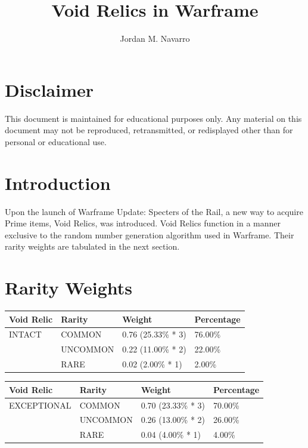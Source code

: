 \documentclass[12pt]{article}
\title{Void Relics in Warframe}
\author{Jordan M. Navarro}
\date{}
\begin{document}
\maketitle

\section{Disclaimer}

This document is maintained for educational purposes only. Any material on this document may not be reproduced, retransmitted, or redisplayed other than for personal or educational use.

\section{Introduction}

Upon the launch of Warframe Update: Specters of the Rail, a new way to acquire Prime items, Void Relics, was introduced. Void Relics function in a manner exclusive to the random number generation algorithm used in Warframe. Their rarity weights are tabulated in the next section.

\section{Rarity Weights}

\begin{center}
	\begin{tabular}{|l||l|l|l|}
		\hline
		Void Relic & Rarity   & Weight             & Percentage \\
		\hline
		INTACT     & COMMON   & 0.76 (25.33\% * 3) & 76.00\%    \\
		           & UNCOMMON & 0.22 (11.00\% * 2) & 22.00\%    \\
		           & RARE     & 0.02 (2.00\% * 1)  & 2.00\%     \\
		\hline
	\end{tabular}
\end{center}

\begin{center}
	\begin{tabular}{|l||l|l|l|}
		\hline
		Void Relic  & Rarity   & Weight             & Percentage \\
		\hline
		EXCEPTIONAL & COMMON   & 0.70 (23.33\% * 3) & 70.00\%    \\
		            & UNCOMMON & 0.26 (13.00\% * 2) & 26.00\%    \\
		            & RARE     & 0.04 (4.00\% * 1)  & 4.00\%     \\
		\hline
	\end{tabular}
\end{center}
\end{document}
